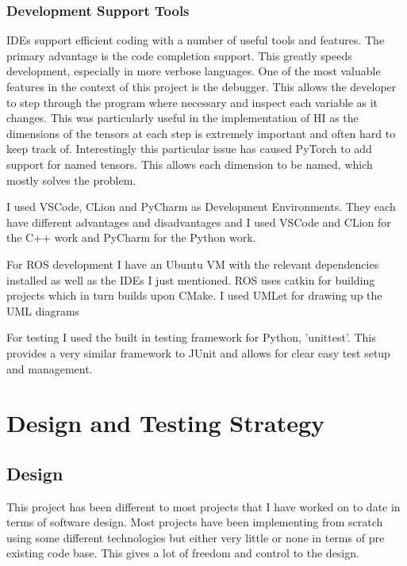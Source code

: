 \documentclass[]{../resources/final_report}
\begin{document}


\subsubsection{Development Support Tools}

IDEs support efficient coding with a number of useful tools and features. The primary advantage 
is the code completion support. This greatly speeds development, especially in more verbose 
languages. One of the most valuable features in the context of this project is the debugger.
This allows the developer to step through the program where necessary and inspect each variable
as it changes. This was particularly useful in the implementation of HI as the dimensions of the
tensors at each step is extremely important and often hard to keep track of. Interestingly 
this particular issue has caused PyTorch to add support for named tensors. This allows each 
dimension to be named, which mostly solves the problem.

I used VSCode, CLion and PyCharm as Development Environments. They each have different advantages 
and disadvantages and I used VSCode and CLion for the C++ work and PyCharm for the Python work.

For ROS development I have an Ubuntu VM with the relevant dependencies installed as well as the 
IDEs I just mentioned. ROS uses catkin for building projects which in turn builds upon CMake.
I used UMLet for drawing up the UML diagrams 

For testing I used the built in testing framework for Python, 'unittest'. This provides a very 
similar framework to JUnit and allows for clear easy test setup and management.


\section{Design and Testing Strategy}

\subsection{Design}

This project has been different to most projects that I have worked on to date in terms of software 
design. Most projects have been implementing from scratch using some different technologies but 
either very little or none in terms of pre existing code base. This gives a lot of freedom and 
control to the design.
\end{document}
